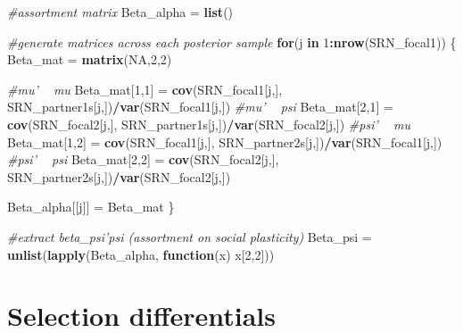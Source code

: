 \documentclass[
]{book}
\newenvironment{Shaded}{\begin{snugshade}}{\end{snugshade}}
\newcommand{\CommentTok}[1]{\textcolor[rgb]{0.56,0.35,0.01}{\textit{#1}}}
\newcommand{\ControlFlowTok}[1]{\textcolor[rgb]{0.13,0.29,0.53}{\textbf{#1}}}
\newcommand{\DecValTok}[1]{\textcolor[rgb]{0.00,0.00,0.81}{#1}}
\newcommand{\KeywordTok}[1]{\textcolor[rgb]{0.13,0.29,0.53}{\textbf{#1}}}
\newcommand{\NormalTok}[1]{#1}
\newcommand{\OperatorTok}[1]{\textcolor[rgb]{0.81,0.36,0.00}{\textbf{#1}}}
\newcommand{\OtherTok}[1]{\textcolor[rgb]{0.56,0.35,0.01}{#1}}
\newcommand{\StringTok}[1]{\textcolor[rgb]{0.31,0.60,0.02}{#1}}
\begin{document}
\begin{Shaded}
\begin{Highlighting}[]
    \CommentTok{#assortment matrix}
\NormalTok{    Beta_alpha =}\StringTok{ }\KeywordTok{list}\NormalTok{()}
    
    \CommentTok{#generate matrices across each posterior sample}
    \ControlFlowTok{for}\NormalTok{(j }\ControlFlowTok{in} \DecValTok{1}\OperatorTok{:}\KeywordTok{nrow}\NormalTok{(SRN_focal1))}
\NormalTok{    \{}
\NormalTok{            Beta_mat =}\StringTok{ }\KeywordTok{matrix}\NormalTok{(}\OtherTok{NA}\NormalTok{,}\DecValTok{2}\NormalTok{,}\DecValTok{2}\NormalTok{)}
            
            \CommentTok{#mu' ~ mu}
\NormalTok{            Beta_mat[}\DecValTok{1}\NormalTok{,}\DecValTok{1}\NormalTok{] =}\StringTok{  }\KeywordTok{cov}\NormalTok{(SRN_focal1[j,], SRN_partner1s[j,])}\OperatorTok{/}\KeywordTok{var}\NormalTok{(SRN_focal1[j,])}
            \CommentTok{#mu' ~ psi}
\NormalTok{            Beta_mat[}\DecValTok{2}\NormalTok{,}\DecValTok{1}\NormalTok{] =}\StringTok{  }\KeywordTok{cov}\NormalTok{(SRN_focal2[j,], SRN_partner1s[j,])}\OperatorTok{/}\KeywordTok{var}\NormalTok{(SRN_focal2[j,])}
            \CommentTok{#psi' ~ mu                                                        }
\NormalTok{            Beta_mat[}\DecValTok{1}\NormalTok{,}\DecValTok{2}\NormalTok{] =}\StringTok{  }\KeywordTok{cov}\NormalTok{(SRN_focal1[j,], SRN_partner2s[j,])}\OperatorTok{/}\KeywordTok{var}\NormalTok{(SRN_focal1[j,])}
            \CommentTok{#psi' ~ psi}
\NormalTok{            Beta_mat[}\DecValTok{2}\NormalTok{,}\DecValTok{2}\NormalTok{] =}\StringTok{  }\KeywordTok{cov}\NormalTok{(SRN_focal2[j,], SRN_partner2s[j,])}\OperatorTok{/}\KeywordTok{var}\NormalTok{(SRN_focal2[j,])}
            
\NormalTok{            Beta_alpha[[j]] =}\StringTok{ }\NormalTok{Beta_mat}
\NormalTok{    \} }

    \CommentTok{#extract beta_psi'psi (assortment on social plasticity)}
\NormalTok{    Beta_psi =}\StringTok{ }\KeywordTok{unlist}\NormalTok{(}\KeywordTok{lapply}\NormalTok{(Beta_alpha, }\ControlFlowTok{function}\NormalTok{(x) x[}\DecValTok{2}\NormalTok{,}\DecValTok{2}\NormalTok{]))}
\end{Highlighting}
\end{Shaded}

\hypertarget{selection-differentials}{%
\section{Selection differentials}\label{selection-differentials}}
\end{document}

